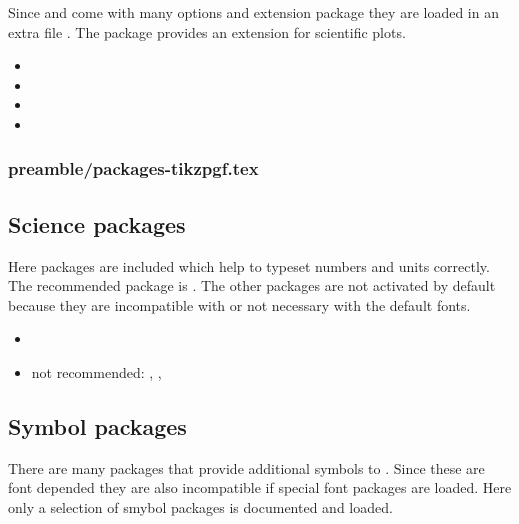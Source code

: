 Since  and  come with many options and 
extension package they are loaded in an extra file 
. The package  
provides an extension for scientific plots.

\begin{itemize}[noitemsep]
\item {}
\item {}
\item {}
\item {}
\end{itemize}



\subsubsection{preamble/packages-tikzpgf.tex}


\subsection{Science packages}
Here packages are included which help to typeset numbers and units correctly.
The recommended package is . The other packages are not activated by default because they are incompatible with  or not necessary with the default fonts.

\begin{itemize}[noitemsep]
\item {}
\item not recommended: , ,  
\end{itemize}


\subsection{Symbol packages}
There are many packages that provide additional symbols to \latex . Since these are font depended they are also incompatible if special font packages are loaded. Here only a selection of smybol packages is documented and loaded.

